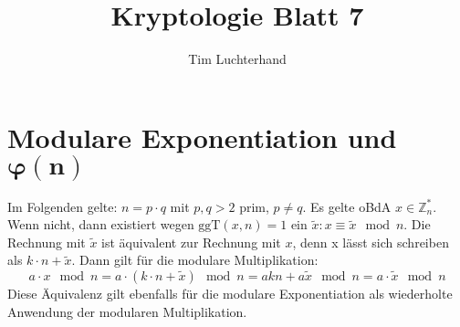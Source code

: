 \documentclass[DIN, pagenumber=false, fontsize=11pt, parskip=half]{scrartcl}
\title{Kryptologie Blatt 7}
\author{Tim Luchterhand}
\newcommand{\Z}[0]{\mathbb{Z}}
\newcommand{\ggt}{\text{ggT}}
\newcommand{\congTo}[3][]{\stackrel{#1}{\equiv} #2\mod #3}
\begin{document}
    \maketitle
    \setcounter{section}{1}
    \section{Modulare Exponentiation und $\mathbf{\bm{\varphi}(n)}$}
    Im Folgenden gelte: $n = p \cdot q$ mit $p, q > 2$ prim, $p \neq q$. Es gelte oBdA $x \in \Z_n^*$. Wenn nicht, dann existiert wegen $\ggt(x, n) = 1$
    ein $\tilde{x} : x \congTo{\tilde{x}}{n}$. Die Rechnung mit $\tilde{x}$ ist äquivalent zur Rechnung mit $x$, denn x lässt sich schreiben als 
    $k \cdot n + \tilde{x}$. Dann gilt für die modulare Multiplikation:
    \begin{equation}
        a \cdot x \mod n = a \cdot (k \cdot n + \tilde{x}) \mod n = a k n + a \tilde{x} \mod n = a \cdot \tilde{x} \mod n 
        \label{eq:obda}
    \end{equation}
    Diese Äquivalenz gilt ebenfalls für die modulare Exponentiation als wiederholte Anwendung der modularen Multiplikation.
\end{document}
